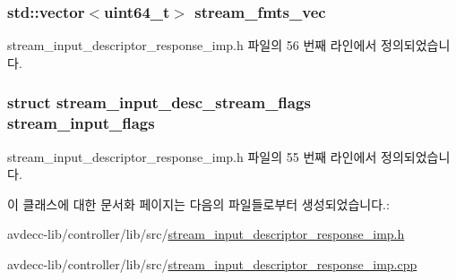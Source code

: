 \subsubsection[{\texorpdfstring{stream\+\_\+fmts\+\_\+vec}{stream_fmts_vec}}]{\setlength{\rightskip}{0pt plus 5cm}std\+::vector$<${\bf uint64\+\_\+t}$>$ stream\+\_\+fmts\+\_\+vec\hspace{0.3cm}{\ttfamily [private]}}\hypertarget{classavdecc__lib_1_1stream__input__descriptor__response__imp_a1fd13ea03cfad2d7e41d304eb40af49a}{}\label{classavdecc__lib_1_1stream__input__descriptor__response__imp_a1fd13ea03cfad2d7e41d304eb40af49a}


stream\+\_\+input\+\_\+descriptor\+\_\+response\+\_\+imp.\+h 파일의 56 번째 라인에서 정의되었습니다.

\subsubsection[{\texorpdfstring{stream\+\_\+input\+\_\+flags}{stream_input_flags}}]{\setlength{\rightskip}{0pt plus 5cm}struct {\bf stream\+\_\+input\+\_\+desc\+\_\+stream\+\_\+flags} stream\+\_\+input\+\_\+flags\hspace{0.3cm}{\ttfamily [private]}}\hypertarget{classavdecc__lib_1_1stream__input__descriptor__response__imp_ae4c5137e195c92f8b8991d082ff48ee4}{}\label{classavdecc__lib_1_1stream__input__descriptor__response__imp_ae4c5137e195c92f8b8991d082ff48ee4}


stream\+\_\+input\+\_\+descriptor\+\_\+response\+\_\+imp.\+h 파일의 55 번째 라인에서 정의되었습니다.



이 클래스에 대한 문서화 페이지는 다음의 파일들로부터 생성되었습니다.\+:\begin{DoxyCompactItemize}
\item 
avdecc-\/lib/controller/lib/src/\hyperlink{stream__input__descriptor__response__imp_8h}{stream\+\_\+input\+\_\+descriptor\+\_\+response\+\_\+imp.\+h}\item 
avdecc-\/lib/controller/lib/src/\hyperlink{stream__input__descriptor__response__imp_8cpp}{stream\+\_\+input\+\_\+descriptor\+\_\+response\+\_\+imp.\+cpp}\end{DoxyCompactItemize}
